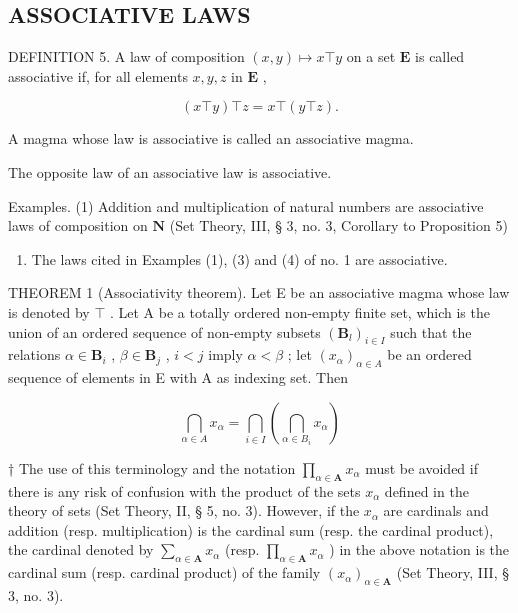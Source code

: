\subsection{ASSOCIATIVE LAWS}

DEFINITION 5. A law of composition \((x,y)\mapsto x\top y\) on a set \(\mathbf{E}\) is called associative if, for all elements \(x,y,z\) in \(\mathbf{E}\) ,

\[
(x \top y) \top z = x \top (y \top z).
\]

A magma whose law is associative is called an associative magma.

The opposite law of an associative law is associative.

Examples. (1) Addition and multiplication of natural numbers are associative laws of composition on \(\mathbf{N}\) (Set Theory, III, § 3, no. 3, Corollary to Proposition 5)

\begin{enumerate}
\def\labelenumi{(\arabic{enumi})}
\setcounter{enumi}{1}
\tightlist
\item
  The laws cited in Examples (1), (3) and (4) of no. 1 are associative.
\end{enumerate}

THEOREM 1 (Associativity theorem). Let E be an associative magma whose law is denoted by \(\top\) . Let A be a totally ordered non-empty finite set, which is the union of an ordered sequence of non-empty subsets \((\mathbf{B}_l)_{i \in I}\) such that the relations \(\alpha \in \mathbf{B}_i\) , \(\beta \in \mathbf{B}_j\) , \(i < j\) imply \(\alpha < \beta\) ; let \((x_\alpha)_{\alpha \in A}\) be an ordered sequence of elements in E with A as indexing set. Then

\[
\bigcap_ {\alpha \in A} x _ {\alpha} = \bigcap_ {i \in I} \left(\bigcap_ {\alpha \in B _ {i}} x _ {\alpha}\right)\tag{3}
\]

† The use of this terminology and the notation \(\prod_{\alpha \in \mathbf{A}} x_{\alpha}\) must be avoided if there is any risk of confusion with the product of the sets \(x_{\alpha}\) defined in the theory of sets (Set Theory, II, § 5, no. 3). However, if the \(x_{\alpha}\) are cardinals and addition (resp. multiplication) is the cardinal sum (resp. the cardinal product), the cardinal denoted by \(\sum_{\alpha \in \mathbf{A}} x_{\alpha}\) (resp. \(\prod_{\alpha \in \mathbf{A}} x_{\alpha}\) ) in the above notation is the cardinal sum (resp. cardinal product) of the family \((x_{\alpha})_{\alpha \in \mathbf{A}}\) (Set Theory, III, § 3, no. 3).

